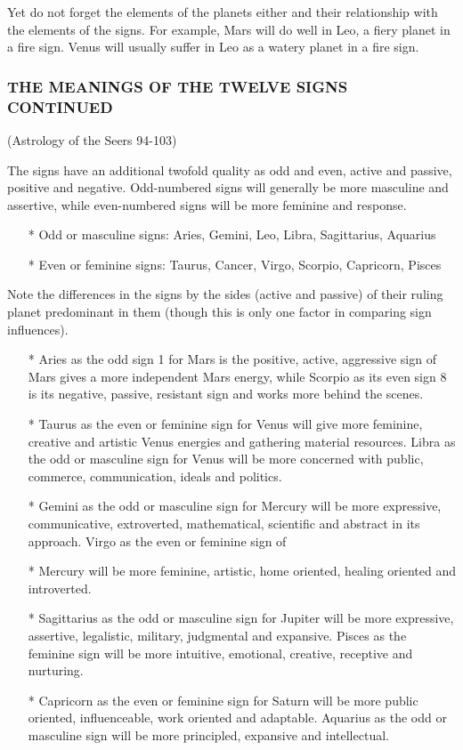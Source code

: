 Yet do not forget the elements of the planets either and their relationship with the elements of the signs. For example, Mars will do well in Leo, a fiery planet in a fire sign. Venus will usually suffer in Leo as a watery planet in a fire sign.

\subsubsection{THE MEANINGS OF THE TWELVE SIGNS CONTINUED} (Astrology of the Seers 94-103)

 

The signs have an additional twofold quality  as odd and even, active and passive, positive and negative. Odd-numbered signs will generally be more masculine and assertive, while even-numbered signs will be more feminine and response.

 


\begin{enumerate}
\item[*] Odd or masculine signs: Aries, Gemini, Leo, Libra, Sagittarius, Aquarius
\item[*] Even or feminine signs: Taurus, Cancer, Virgo, Scorpio, Capricorn, Pisces
    \end{enumerate}

Note the differences in the signs by the sides (active and passive) of their ruling planet predominant in them (though this is only one factor in comparing sign influences).

\begin{enumerate}
\item[*] Aries as the odd sign 1 for Mars is the positive, active, aggressive sign of Mars gives a more independent Mars energy, while Scorpio as its even sign 8 is its negative, passive, resistant sign and works more behind the scenes.
\item[*] Taurus as the even or feminine sign for Venus will give more feminine, creative and artistic Venus energies and gathering material resources. Libra as the odd or masculine sign for Venus will be more concerned with public, commerce, communication, ideals and politics.
\item[*] Gemini as the odd or masculine sign for Mercury will be more expressive, communicative, extroverted, mathematical, scientific and abstract in its approach. Virgo as the even or feminine sign of \item[*] Mercury will be more feminine, artistic, home oriented, healing oriented and introverted.
\item[*] Sagittarius as the odd or masculine sign for Jupiter will be more expressive, assertive, legalistic, military, judgmental and expansive. Pisces as the feminine sign will be more intuitive, emotional, creative, receptive and nurturing.
\item[*] Capricorn as the even or feminine sign for Saturn will be more public oriented, influenceable, work oriented and adaptable. Aquarius as the odd or masculine sign will be more principled, expansive and intellectual.
   \end{enumerate}

